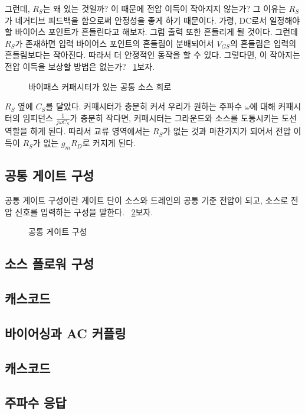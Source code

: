 그런데, $R_S$는 왜 있는 것일까? 이 때문에 전압 이득이 작아지지 않는가? 그 이유는 $R_S$가 네거티브 피드백을 함으로써 안정성을 좋게 하기 때문이다.
가령, DC로서 일정해야 할 바이어스 포인트가 흔들린다고 해보자. 그럼 출력 또한 흔들리게 될 것이다.
그런데 $R_S$가 존재하면 입력 바이어스 포인트의 흔들림이 분배되어서 $V_{GS}$의 흔들림은 입력의 흔들림보다는 작아진다. 따라서 더 안정적인 동작을 할 수 있다.
그렇다면, 이 작아지는 전압 이득을 보상할 방법은 없는가? \figurename~\ref{fig:cs with bypass cap}\을 보자.
\begin{figure}[!hpb]
    \centering
    \caption{바이패스 커패시터가 있는 공통 소스 회로}\label{fig:cs with bypass cap}
\end{figure}
$R_S$ 옆에 $C_S$를 달았다. 커패시터가 충분히 커서 우리가 원하는 주파수 $\omega$에 대해 커패시터의 임피던스 $\frac{1}{j\omega C_S}$가 충분히 작다면, 커패시터는 그라운드와 소스를 도통시키는 도선 역할을 하게 된다.
따라서 교류 영역에서는 $R_S$가 없는 것과 마찬가지가 되어서 전압 이득이 $R_S$가 없는 $g_mR_D$로 커지게 된다.\

\subsection{공통 게이트 구성}
공통 게이트 구성이란 게이트 단이 소스와 드레인의 공통 기준 전압이 되고, 소스로 전압 신호를 입력하는 구성을 말한다. \figurename~\ref{fig:cg topology}\를 보자.
\begin{figure}[!tpb]
    \centering
    \caption{공통 게이트 구성}\label{fig:cg topology}
\end{figure}

\subsection{소스 폴로워 구성}

\subsection{캐스코드}

\subsection{바이어싱과 AC 커플링}

\subsection{캐스코드}

\subsection{주파수 응답}